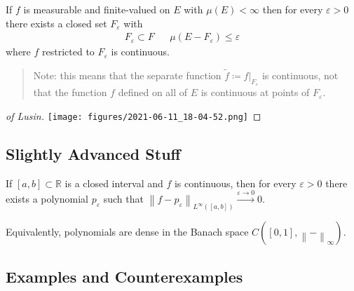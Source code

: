\begin{theorem}

If \(f\) is measurable and finite-valued on \(E\) with
\(\mu(E) < \infty\) then for every \({\varepsilon}>0\) there exists a
closed set \(F_{\varepsilon}\) with
\begin{align*}
F_{\varepsilon}\subset F && \mu(E - F_{\varepsilon}) \leq {\varepsilon}
\end{align*}
where \(f\) restricted to \(F_{\varepsilon}\) is continuous.

\begin{quote}
Note: this means that the separate function
\(\tilde f \coloneqq{ \left.{{f}} \right|_{{F_{\varepsilon}}} }\) is
continuous, not that the function \(f\) defined on all of \(E\) is
continuous at points of \(F_{\varepsilon}\).
\end{quote}

\end{theorem}

\begin{proof}[of Lusin]

\texttt{[image: figures/2021-06-11\_18-04-52.png]}

\end{proof}

\hypertarget{slightly-advanced-stuff}{%
\subsection{Slightly Advanced Stuff}\label{slightly-advanced-stuff}}

\begin{theorem}

If \([a, b] \subset {\mathbb{R}}\) is a closed interval and \(f\) is
continuous, then for every \({\varepsilon}> 0\) there exists a
polynomial \(p_{\varepsilon}\) such that
\({\left\lVert {f- p_{\varepsilon}} \right\rVert}_{L^\infty([a, b])} \overset{{\varepsilon}\to 0}\to 0\).

Equivalently, polynomials are dense in the Banach space
\(C([0, 1], {\left\lVert {{-}} \right\rVert}_\infty)\).

\end{theorem}

\hypertarget{examples-and-counterexamples}{%
\subsection{Examples and
Counterexamples}\label{examples-and-counterexamples}}

